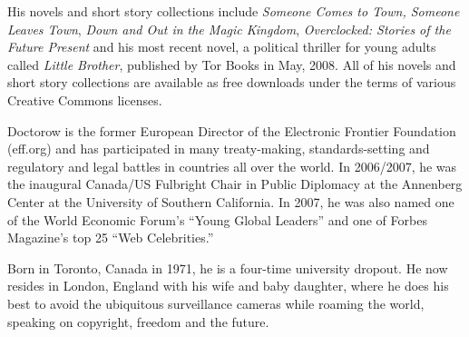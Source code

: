 His novels and short story collections include
\emph{Someone Comes to Town, Someone Leaves Town},
\emph{Down and Out in the Magic Kingdom},
\emph{Overclocked: Stories of the Future Present} and his most
recent novel, a political thriller for young adults called
\emph{Little Brother}, published by Tor Books in May, 2008. All
of his novels and short story collections are available as free
downloads under the terms of various Creative Commons licenses.

Doctorow is the former European Director of the Electronic Frontier
Foundation (eff.org) and has participated in many treaty-making,
standards-setting and regulatory and legal battles in countries all
over the world. In 2006/2007, he was the inaugural Canada/US
Fulbright Chair in Public Diplomacy at the Annenberg Center at the
University of Southern California. In 2007, he was also named one
of the World Economic Forum's ``Young Global Leaders'' and one of
Forbes Magazine's top 25 ``Web Celebrities.''

Born in Toronto, Canada in 1971, he is a four-time university
dropout. He now resides in London, England with his wife and baby
daughter, where he does his best to avoid the ubiquitous
surveillance cameras while roaming the world, speaking on
copyright, freedom and the future.


